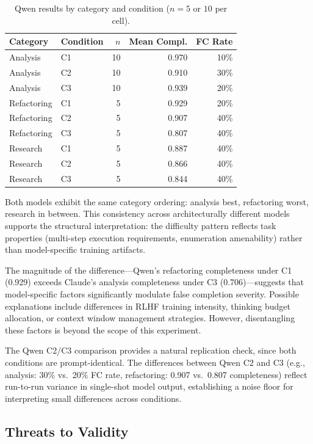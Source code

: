 \begin{table}[htbp]
\centering
\caption{Qwen results by category and condition ($n = 5$ or $10$ per cell).}
\label{tab:qwen-detail}
\begin{tabular}{llrrr}
\toprule
Category & Condition & $n$ & Mean Compl. & FC Rate \\
\midrule
Analysis    & C1 & 10 & 0.970 & 10\% \\
Analysis    & C2 & 10 & 0.910 & 30\% \\
Analysis    & C3 & 10 & 0.939 & 20\% \\
\midrule
Refactoring & C1 & 5 & 0.929 & 20\% \\
Refactoring & C2 & 5 & 0.907 & 40\% \\
Refactoring & C3 & 5 & 0.807 & 40\% \\
\midrule
Research    & C1 & 5 & 0.887 & 40\% \\
Research    & C2 & 5 & 0.866 & 40\% \\
Research    & C3 & 5 & 0.844 & 40\% \\
\bottomrule
\end{tabular}
\end{table}

Both models exhibit the same category ordering: analysis best, refactoring worst, research in between.
This consistency across architecturally different models supports the structural interpretation: the difficulty pattern reflects task properties (multi-step execution requirements, enumeration amenability) rather than model-specific training artifacts.

The magnitude of the difference---Qwen's refactoring completeness under C1 (0.929) exceeds Claude's analysis completeness under C3 (0.706)---suggests that model-specific factors significantly modulate false completion severity.
Possible explanations include differences in RLHF training intensity, thinking budget allocation, or context window management strategies.
However, disentangling these factors is beyond the scope of this experiment.

The Qwen C2/C3 comparison provides a natural replication check, since both conditions are prompt-identical.
The differences between Qwen C2 and C3 (e.g., analysis: 30\% vs.\ 20\% FC rate, refactoring: 0.907 vs.\ 0.807 completeness) reflect run-to-run variance in single-shot model output, establishing a noise floor for interpreting small differences across conditions.


\subsection{Threats to Validity}
\label{sec:exp-threats}

